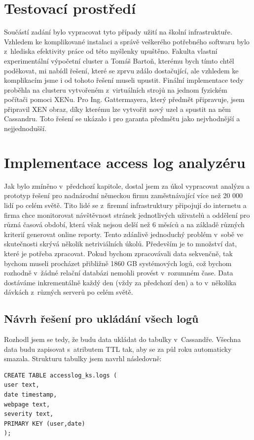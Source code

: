 \section{Testovací prostředí}
Součástí zadání bylo vypracovat tyto případy užití na školní infrastruktuře. Vzhledem ke komplikované instalaci a správě veškerého potřebného softwaru bylo z~hlediska efektivity práce od této myšlenky upuštěno. Fakulta vlastní experimentální výpočetní cluster a Tomáš Bartoň, kterému bych tímto chtěl poděkovat, mi nabídl řešení, které se zprvu zdálo dostačující, ale vzhledem ke komplikacím jsme i od tohoto řešení museli upustit. Finální implementace tedy proběhla na clusteru vytvořeném z~virtuálních strojů na jednom fyzickém počítači pomoci XENu. Pro Ing. Gattermayera, který předmět připravuje, jsem připravil XEN obraz, díky kterému lze vytvořit nový uzel a spustit na něm Cassandru. Toto řešení se ukázalo i pro garanta předmětu jako nejvhodnější a nejjednodušší. 

\section{Implementace access log analyzéru}
Jak bylo zmíněno v~předchozí kapitole, dostal jsem za úkol vypracovat analýzu a prototyp řešení pro nadnárodní německou firmu zaměstnávající více než 20 000 lidí po celém světě. Tito lidé se z~firemní infrastruktury připojují do internetu a firma chce monitorovat návštěvnost stránek jednotlivých uživatelů a oddělení pro různá časová období, která však nejsou delší než 6 měsíců a na základě různých kriterií generovat online reporty. Tento zdánlivě jednoduchý problém v~sobě ve skutečnosti skrývá několik netriviálních úkolů. Především je to množství dat, které je potřeba zpracovat. Pokud bychom zpracovávali data sekvenčně, tak bychom museli procházet přibližně 1860 GB systémových logů, což bychom rozhodně v~žádné relační databázi nemohli provést v~rozumném čase. Data dostáváme inkrementálně každý den (vždy za předchozí den) a to v~několika dávkách z~různých serverů po celém světě. 


\subsection{Návrh řešení pro ukládání všech logů}
Rozhodl jsem se tedy, že budu data ukládat do tabulky v~Cassandře. Všechna data budu zapisovat s~atributem TTL tak, aby se za půl roku automaticky smazala. Strukturu tabulky jsem navrhl následovně: 

\begin{lstlisting}[caption={Návrh tabulky pro ukládání všech logů},label=LogTable]
CREATE TABLE accesslog_ks.logs ( 
user text,
date timestamp,
webpage text,
severity text,
PRIMARY KEY (user,date) 
);
\end{lstlisting}

